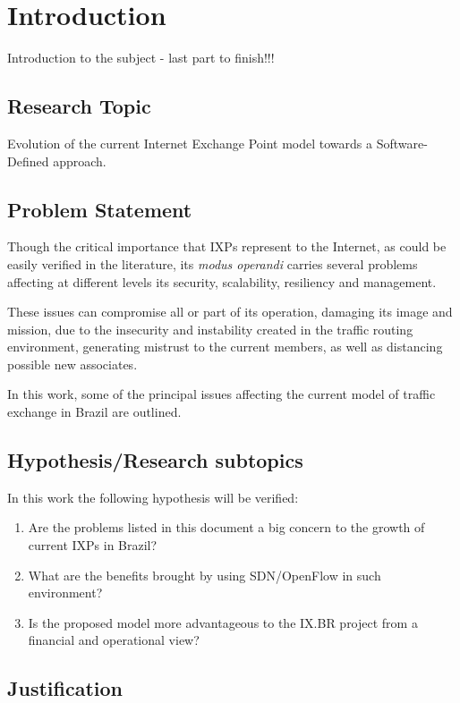 \chapter{Introduction}
\label{cap:introduction}
Introduction to the subject - last part to finish!!!


\section{Research Topic}
\label{sec:research_topic}
Evolution of the current Internet Exchange Point model towards a Software-Defined approach.

\section{Problem Statement}
\label{sec:problem_statement}

Though the critical importance that IXPs represent to the Internet, as could be easily verified in the literature, its \textit{modus operandi} carries several problems affecting at different levels its security, scalability, resiliency and management.

These issues can compromise all or part of its operation, damaging its image and mission, due to the insecurity and instability created in the traffic routing environment, generating mistrust to the current members, as well as distancing possible new associates.

In this work, some of the principal issues affecting the current model of traffic exchange in Brazil are outlined. 


\section{Hypothesis/Research subtopics}
\label{sec:hypothesis}

In this work the following hypothesis will be verified:
\begin{enumerate}
    \item Are the problems listed in this document a big concern to the growth of current IXPs in Brazil?
    \item What are the benefits brought by using SDN/OpenFlow in such environment?
    \item Is the proposed model more advantageous to the IX.BR project from a financial and operational view?
\end{enumerate}

\section{Justification}
\label{sec:justification}

